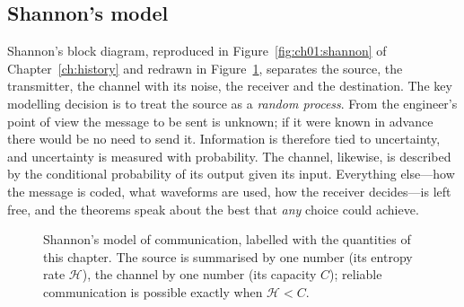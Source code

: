 \subsection{Shannon's model}

Shannon's block diagram, reproduced in Figure~\ref{fig:ch01:shannon} of Chapter~\ref{ch:history}
and redrawn in Figure~\ref{fig:ch13_model}, separates the source, the transmitter, the channel with
its noise, the receiver and the destination. The key modelling decision is to treat the source as
a \emph{random process}. From the engineer's point of view the message to be sent is unknown; if it
were known in advance there would be no need to send it. Information is therefore tied to
uncertainty, and uncertainty is measured with probability. The channel, likewise, is described by
the conditional probability of its output given its input. Everything else---how the message is
coded, what waveforms are used, how the receiver decides---is left free, and the theorems speak
about the best that \emph{any} choice could achieve.

\begin{figure}[htbp]\centering
{}
\caption{Shannon's model of communication, labelled with the quantities of this chapter. The
source is summarised by one number (its entropy rate $\mathcal{H}$), the channel by one number
(its capacity $C$); reliable communication is possible exactly when $\mathcal{H}<C$.}
\label{fig:ch13_model}
\end{figure}

